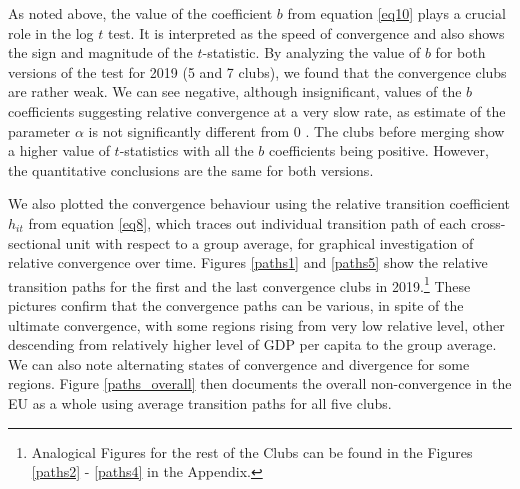 \documentclass[11pt]{article}
\begin{document}
\begin{table}[!htbp] \centering 
 \caption{Convergence club classification after merging (2015)} 
  \label{Table_clubs1_2015} 
\end{table}


As noted above, the value of the coefficient $b$ from equation \ref{eq10} plays a crucial role in the log $t$ test. It is interpreted as the speed of convergence and also shows the sign and magnitude of the $t$-statistic. By analyzing the value of $b$ for both versions of the test for 2019 (5 and 7 clubs), we found that the convergence clubs are rather weak. We can see negative, although insignificant, values of the $b$ coefficients suggesting relative convergence at a very slow rate, as estimate of the parameter $\alpha$ is not significantly different from 0 \citep{phillips2007transition}. The clubs before merging show a higher value of $t$-statistics with all the $b$ coefficients being positive. However, the quantitative conclusions are the same for both versions.

We also plotted the convergence behaviour using the relative transition coefficient $h_{it}$ from equation \ref{eq8}, which traces out individual transition path of each cross-sectional unit with respect to a group average, for graphical investigation of relative convergence over time. Figures \ref{paths1} and \ref{paths5} show the relative transition paths for the first and the last convergence clubs in 2019.\footnote{Analogical Figures for the rest of the Clubs can be found in the Figures \ref{paths2} - \ref{paths4} in the Appendix.} These pictures confirm that the convergence paths can be various, in spite of the ultimate convergence, with some regions rising from very low relative level, other descending from relatively higher level of GDP per capita to the group average. We can also note alternating states of convergence and divergence for some regions. Figure \ref{paths_overall} then documents the overall non-convergence in the EU as a whole using average transition paths for all five clubs.
\end{document}
